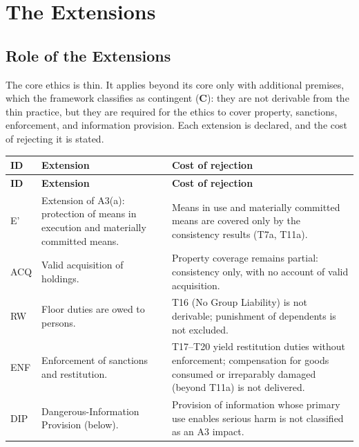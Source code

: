 \documentclass[11pt]{article}
\def\ensuremath#1{#1}%
\def\mathrm#1{#1}%
\newcommand{\statusC}{\textcolor{stC}{\textbf{C}}}
\newcommand{\Eprime}{\ensuremath{\mathrm{E}'}}
\begin{document}
\section{The Extensions}\label{sec:extensions}
\subsection{Role of the Extensions}
The core ethics is thin. It applies beyond its core only with additional premises, which the framework classifies as contingent (\statusC{}): they are not derivable from the thin practice, but they are required for the ethics to cover property, sanctions, enforcement, and information provision. Each extension is declared, and the cost of rejecting it is stated.
\begin{longtable}{@{}L{1.6cm} L{5.0cm} L{8.4cm}@{}}
\toprule
\textbf{ID} & \textbf{Extension} & \textbf{Cost of rejection} \\
\midrule
\endfirsthead
\toprule
\textbf{ID} & \textbf{Extension} & \textbf{Cost of rejection} \\
\midrule
\endhead
\bottomrule
\endfoot
\Eprime{} & Extension of A3(a): protection of means in execution and materially committed means. & Means in use and materially committed means are covered only by the consistency results (T7a, T11a). \\
ACQ & Valid acquisition of holdings. & Property coverage remains partial: consistency only, with no account of valid acquisition. \\
RW & Floor duties are owed to persons. & T16 (No Group Liability) is not derivable; punishment of dependents is not excluded. \\
ENF & Enforcement of sanctions and restitution. & T17--T20 yield restitution duties without enforcement; compensation for goods consumed or irreparably damaged (beyond T11a) is not delivered. \\
DIP & Dangerous-Information Provision (below). & Provision of information whose primary use enables serious harm is not classified as an A3 impact. \\
\end{longtable}
\end{document}
